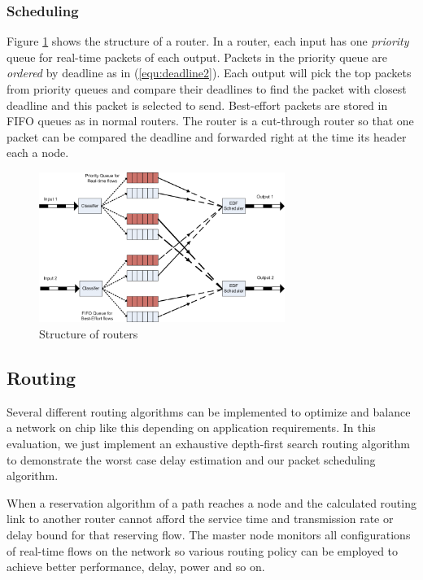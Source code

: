 \documentclass[conference, twocolumn]{IEEEtran}
\theoremstyle{definition}
\begin{document}
\subsubsection{Scheduling}
Figure \ref{fig:RouterStructure} shows the structure of a router. In a router,
each input has one {\em priority} queue for real-time packets of each output.
Packets in the priority queue are {\em ordered} by deadline as in
(\ref{equ:deadline2}). Each output will pick the top packets from priority
queues and compare their deadlines to find the packet with closest deadline and this
packet is selected to send. Best-effort packets are stored in FIFO queues as in
normal routers. The router is a cut-through router so that one packet can be
compared the deadline and forwarded right at the time its header each a node.

\begin{figure}[htp]
\centering
\includegraphics[width=8cm]{pics/Router.png}
\caption[Other Spec.]
{Structure of routers}\label{fig:RouterStructure}
\end{figure}

\subsection{Routing}

Several different routing algorithms can be implemented to optimize and balance
a network on chip like this depending on application requirements. In this
evaluation, we just implement an exhaustive depth-first search routing algorithm
to demonstrate the worst case delay estimation and our packet scheduling algorithm.

When a reservation algorithm of a path reaches a node and the calculated routing
link to another router cannot afford the service time and transmission rate or delay 
bound for that reserving flow. The master node monitors all configurations of
real-time flows on the network so various routing policy can be employed to
achieve better performance, delay, power and so on.
\end{document}
